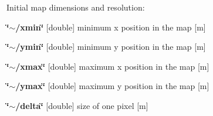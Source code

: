 Initial map dimensions and resolution\+:
\begin{DoxyItemize}
\item {\bfseries \char`\"{}$\sim$/xmin\char`\"{}} {\bfseries }\mbox{[}double\mbox{]} minimum x position in the map \mbox{[}m\mbox{]}
\item {\bfseries \char`\"{}$\sim$/ymin\char`\"{}} {\bfseries }\mbox{[}double\mbox{]} minimum y position in the map \mbox{[}m\mbox{]}
\item {\bfseries \char`\"{}$\sim$/xmax\char`\"{}} {\bfseries }\mbox{[}double\mbox{]} maximum x position in the map \mbox{[}m\mbox{]}
\item {\bfseries \char`\"{}$\sim$/ymax\char`\"{}} {\bfseries }\mbox{[}double\mbox{]} maximum y position in the map \mbox{[}m\mbox{]}
\item {\bfseries \char`\"{}$\sim$/delta\char`\"{}} {\bfseries }\mbox{[}double\mbox{]} size of one pixel \mbox{[}m\mbox{]} 
\end{DoxyItemize}